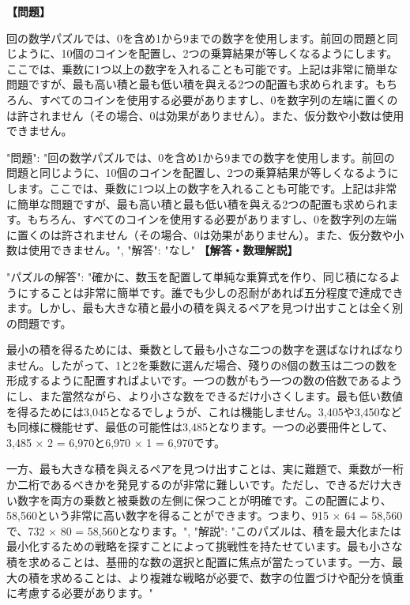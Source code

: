 \documentclass[10pt,a4paper,oneside,openany]{ltjsbook}
\begin{document}
\begin{tcolorbox}[colback=softblue,colframe=primaryblue,title=\textbf{第 82 問：THE TEN COUNTERS.},arc=2mm,boxrule=1pt,breakable]
\textbf{【問題】}\par\vspace{0.3em}
回の数学パズルでは、0を含め1から9までの数字を使用します。前回の問題と同じように、10個のコインを配置し、2つの乗算結果が等しくなるようにします。ここでは、乗数に1つ以上の数字を入れることも可能です。上記は非常に簡単な問題ですが、最も高い積と最も低い積を與える2つの配置も求められます。もちろん、すべてのコインを使用する必要がありますし、0を数字列の左端に置くのは許されません（その場合、0は効果がありません）。また、仮分数や小数は使用できません。

{
"問題": "回の数学パズルでは、0を含め1から9までの数字を使用します。前回の問題と同じように、10個のコインを配置し、2つの乗算結果が等しくなるようにします。ここでは、乗数に1つ以上の数字を入れることも可能です。上記は非常に簡単な問題ですが、最も高い積と最も低い積を與える2つの配置も求められます。もちろん、すべてのコインを使用する必要がありますし、0を数字列の左端に置くのは許されません（その場合、0は効果がありません）。また、仮分数や小数は使用できません。",
"解答": "なし"
}
\tcblower
\textbf{【解答・数理解説】}\par\vspace{0.3em}
{
"パズルの解答": "確かに、数玉を配置して単純な乗算式を作り、同じ積になるようにすることは非常に簡単です。誰でも少しの忍耐があれば五分程度で達成できます。しかし、最も大きな積と最小の積を與えるペアを見つけ出すことは全く別の問題です。

最小の積を得るためには、乗数として最も小さな二つの数字を選ばなければなりません。したがって、1と2を乗数に選んだ場合、殘りの8個の数玉は二つの数を形成するように配置すればよいです。一つの数がもう一つの数の倍数であるようにし、また當然ながら、より小さな数をできるだけ小さくします。最も低い数値を得るためには3,045となるでしょうが、これは機能しません。3,405や3,450なども同様に機能せず、最低の可能性は3,485となります。一つの必要冊件として、3,485 × 2 = 6,970と6,970 × 1 = 6,970です。

一方、最も大きな積を與えるペアを見つけ出すことは、実に難題で、乗数が一桁か二桁であるべきかを発見するのが非常に難しいです。ただし、できるだけ大きい数字を両方の乗数と被乗数の左側に保つことが明確です。この配置により、58,560という非常に高い数字を得ることができます。つまり、915 × 64 = 58,560で、732 × 80 = 58,560となります。",
"解説": "このパズルは、積を最大化または最小化するための戦略を探すことによって挑戦性を持たせています。最も小さな積を求めることは、基冊的な数の選択と配置に焦点が當たっています。一方、最大の積を求めることは、より複雑な戦略が必要で、数字の位置づけや配分を慎重に考慮する必要があります。"
}
\end{tcolorbox}
\end{document}
